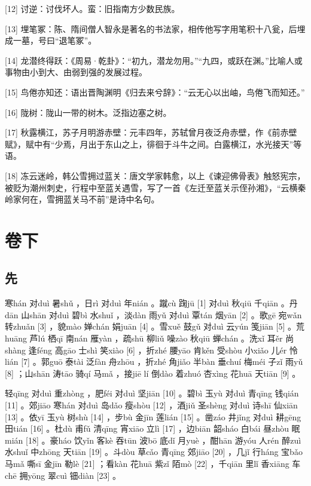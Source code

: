 \documentclass[12pt,UTF8]{ctexbook}
\begin{document}
[12] 讨逆：讨伐坏人。蛮：旧指南方少数民族。

[13] 埋笔冢：陈、隋间僧人智永是著名的书法家，相传他写字用笔积十八瓮，后埋成一墓，号曰“退笔冢”。

[14] 龙潜终得跃：《周易·乾卦》：“初九，潜龙勿用。”“九四，或跃在渊。”比喻人或事物由小到大、由弱到强的发展过程。

[15] 鸟倦亦知还：语出晋陶渊明《归去来兮辞》：“云无心以出岫，鸟倦飞而知还。”

[16] 陇树：陇山一带的树木。泛指边塞之树。

[17] 秋露横江，苏子月明游赤壁：元丰四年，苏轼曾月夜泛舟赤壁，作《前赤壁赋》，赋中有“少焉，月出于东山之上，徘徊于斗牛之间。白露横江，水光接天”等语。

[18] 冻云迷岭，韩公雪拥过蓝关：唐文学家韩愈，以上《谏迎佛骨表》触怒宪宗，被贬为潮州刺史，行程中至蓝关遇雪，写了一首《左迁至蓝关示侄孙湘》，“云横秦岭家何在，雪拥蓝关马不前”是诗中名句。





\part{卷下}

\setcounter{chapter}{0}

\chapter{先}


寒hán 对duì 暑shǔ ，日rì 对duì 年nián 。蹴cù 踘jū [1] 对duì 秋qiū 千qiān 。丹dān 山shān 对duì 碧bì 水shuǐ ，淡dàn 雨yǔ 对duì 覃tán 烟yān [2] 。歌gē 宛wǎn 转zhuǎn [3] ，貌mào 婵chán 娟juān [4] 。雪xuě 鼓gǔ 对duì 云yún 笺jiān [5] 。荒huāng 芦lú 栖qī 南nán 雁yàn ，疏shū 柳liǔ 噪zào 秋qiū 蝉chán 。洗xǐ 耳ěr 尚shàng 逢féng 高gāo 士shì 笑xiào [6] ，折zhé 腰yāo 肯kěn 受shòu 小xiǎo 儿ér 怜lián [7] 。郭guō 泰tài 泛fàn 舟zhōu ，折zhé 角jiǎo 半bàn 垂chuí 梅méi 子zǐ 雨yǔ [8] ；山shān 涛tāo 骑qí 马mǎ ，接jiē lí 倒dào 着zhuó 杏xìng 花huā 天tiān [9] 。

轻qīng 对duì 重zhòng ，肥féi 对duì 坚jiān [10] 。碧bì 玉yù 对duì 青qīng 钱qián [11] 。郊jiāo 寒hán 对duì 岛dǎo 瘦shòu [12] ，酒jiǔ 圣shèng 对duì 诗shī 仙xiān [13] 。依yī 玉yù 树shù [14] ，步bù 金jīn 莲lián [15] 。凿záo 井jǐng 对duì 耕gēng 田tián [16] 。杜dù 甫fǔ 清qīng 宵xiāo 立lì [17] ，边biān 韶sháo 白bái 昼zhòu 眠mián [18] 。豪háo 饮yǐn 客kè 吞tūn 波bō 底dǐ 月yuè ，酣hān 游yóu 人rén 醉zuì 水shuǐ 中zhōng 天tiān [19] 。斗dòu 草cǎo 青qīng 郊jiāo [20] ，几jǐ 行háng 宝bǎo 马mǎ 嘶sī 金jīn 勒lè [21] ；看kàn 花huā 紫zǐ 陌mò [22] ，千qiān 里lǐ 香xiāng 车chē 拥yōng 翠cuì 钿diàn [23] 。
\end{document}
